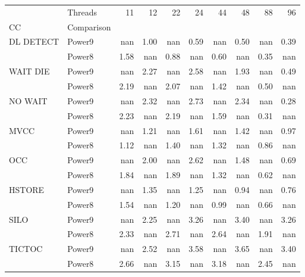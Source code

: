 \begin{tabular}{llrrrrrrrr}
\toprule
       & Threads &   11 &   12 &   22 &   24 &   44 &   48 &   88 &   96 \\
CC & Comparison &      &      &      &      &      &      &      &      \\
\midrule
DL DETECT & Power9 &  nan & 1.00 &  nan & 0.59 &  nan & 0.50 &  nan & 0.39 \\
       & Power8 & 1.58 &  nan & 0.88 &  nan & 0.60 &  nan & 0.35 &  nan \\
WAIT DIE & Power9 &  nan & 2.27 &  nan & 2.58 &  nan & 1.93 &  nan & 0.49 \\
       & Power8 & 2.19 &  nan & 2.07 &  nan & 1.42 &  nan & 0.50 &  nan \\
NO WAIT & Power9 &  nan & 2.32 &  nan & 2.73 &  nan & 2.34 &  nan & 0.28 \\
       & Power8 & 2.23 &  nan & 2.19 &  nan & 1.59 &  nan & 0.31 &  nan \\
MVCC & Power9 &  nan & 1.21 &  nan & 1.61 &  nan & 1.42 &  nan & 0.97 \\
       & Power8 & 1.12 &  nan & 1.40 &  nan & 1.32 &  nan & 0.86 &  nan \\
OCC & Power9 &  nan & 2.00 &  nan & 2.62 &  nan & 1.48 &  nan & 0.69 \\
       & Power8 & 1.84 &  nan & 1.89 &  nan & 1.32 &  nan & 0.62 &  nan \\
HSTORE & Power9 &  nan & 1.35 &  nan & 1.25 &  nan & 0.94 &  nan & 0.76 \\
       & Power8 & 1.54 &  nan & 1.20 &  nan & 0.99 &  nan & 0.66 &  nan \\
SILO & Power9 &  nan & 2.25 &  nan & 3.26 &  nan & 3.40 &  nan & 3.26 \\
       & Power8 & 2.33 &  nan & 2.71 &  nan & 2.64 &  nan & 1.91 &  nan \\
TICTOC & Power9 &  nan & 2.52 &  nan & 3.58 &  nan & 3.65 &  nan & 3.40 \\
       & Power8 & 2.66 &  nan & 3.15 &  nan & 3.18 &  nan & 2.45 &  nan \\
\bottomrule
\end{tabular}
